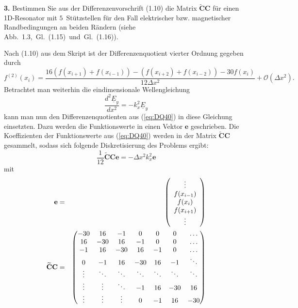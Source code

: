 \documentclass[Protokollheft.tex]{subfiles}
\begin{document}
	\begin{framed}
		\noindent \textbf{3.} Bestimmen Sie aus der Differenzenvorschrift (1.10) die Matrix $\tilde{\textbf{C}}\textbf{C}$ für einen 1D-Resonator mit $5$~Stützstellen für den Fall elektrischer bzw. magnetischer Randbedingungen an beiden Rändern (siehe Abb.~1.3,~Gl.~(1.15)~und~Gl.~(1.16)).\label{exer:matrixCC}
	\end{framed}
	\noindent
	Nach (1.10) aus dem Skript ist der Differenzenquotient vierter Ordnung gegeben durch
	\begin{equation}
	\label{eq:DQ40}
	f^{(2)}(x_i)=\frac{16(f(x_{i+1})+f(x_{i-1}))-(f(x_{i+2})+f(x_{i-2}))-30f(x_i)}{12\Delta x^2}+\mathcal{O}(\Delta x^2).
	\end{equation}
	Betrachtet man weiterhin die eindimensionale Wellengleichung
	\begin{equation*}
		\frac{d^2\underline{E}_y}{dx^2}=-k^2_x\underline{E}_y
	\end{equation*}
	kann man nun den Differenzenquotienten aus (\ref{eq:DQ40}) in diese Gleichung einsetzten. Dazu werden die Funktionswerte in einen Vektor $\mathbf{e}$ geschrieben. Die Koeffizienten der Funktionswerte aus (\ref{eq:DQ40}) werden in der Matrix $\mathbf{\widetilde{C}C}$ gesammelt, sodass sich folgende Diskretisierung des Problems ergibt:
	\begin{equation}
	\label{eq:cc}
	\frac{1}{12}\mathbf{\widetilde{C}Ce}=-\Delta x^2k^2_x\mathbf{e}
	\end{equation}
	mit
	\begin{eqnarray*}
		\mathbf{e}&=&\left(\begin{array}{c} \vdots\\ f(x_{i-1})\\ f(x_i) \\ f(x_{i+1})\\
			\vdots\\\end{array}\right)\\
		\noindent
		\mathbf{\widetilde{C}C}&=&\begin{pmatrix} -30 & 16 & -1 & 0 & 0 & 0 & \dots \\ 
			16 & -30 & 16 & -1 & 0 & 0 & \dots\\ 
			-1 & 16 & -30 & 16 & -1 & 0 & \dots\\ 
			0 & -1 & 16 & -30 & 16 & -1 & \ddots\\ 
			\vdots & \ddots & \ddots & \ddots & \ddots & \ddots & \ddots\\
			\vdots & \vdots & \ddots & -1 & 16 & -30 & 16\\
			\vdots & \vdots & \vdots & 0 & -1 & 16 & -30\\
		\end{pmatrix}
	\end{eqnarray*}
\end{document}
